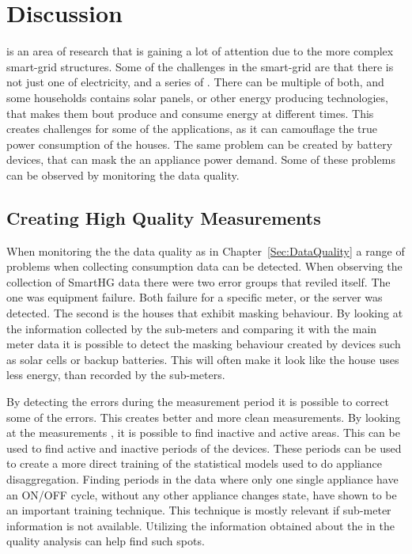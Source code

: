 \chapter{Discussion}

 is an area of research that is gaining a lot of attention due to the more complex smart-grid structures. Some of the challenges in the smart-grid are that there is not just one  of electricity, and a series of . There can be multiple of both, and some households contains solar panels, or other energy producing technologies, that makes them bout produce and consume energy at different times. This creates challenges for some of the  applications, as it can camouflage the true power consumption of the houses. The same problem can be created by battery devices, that can mask the an appliance power demand. Some of these problems can be observed by monitoring the data quality.

\section{Creating High Quality Measurements}
When monitoring the the data quality as in Chapter~\ref{Sec:DataQuality} a range of problems when collecting consumption data can be detected. When observing the collection of SmartHG data there were two error groups that reviled itself. The one was equipment failure. Both failure for a specific meter, or the server was detected. The second is the houses that exhibit masking behaviour. By looking at the information collected by the sub-meters and comparing it with the main meter data it is possible to detect the masking behaviour created by devices such as solar cells or backup batteries. This will often make it look like the house uses less energy, than recorded by the sub-meters. 

By detecting the errors during the measurement period it is possible to correct some of the errors. This creates better and more clean measurements. By looking at the measurements , it is possible to find inactive and active areas. This can be used to find active and inactive periods of the devices. These periods can be used to create a more direct training of the statistical models used to do appliance disaggregation. Finding periods in the data where only one single appliance have an ON/OFF cycle, without any other appliance changes state, have shown to be an important training technique. This technique is mostly relevant if sub-meter information is not available. Utilizing the information obtained about the  in the quality analysis can help find such spots.


